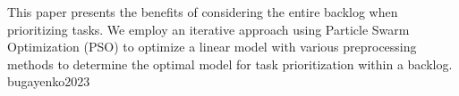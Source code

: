 \documentclass{article}
\begin{document}

  {This paper presents the benefits of considering the entire backlog when prioritizing tasks. We employ an iterative approach using Particle Swarm Optimization (PSO) to optimize a linear model with various preprocessing methods to determine the optimal model
for task prioritization within a backlog.}
  {bugayenko2023}
\end{document}
